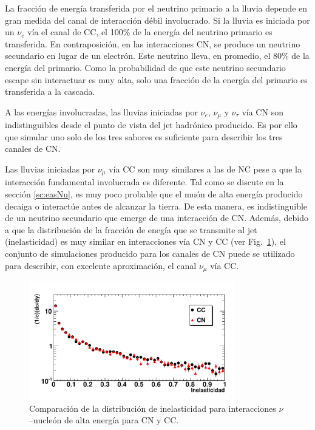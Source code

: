 	La fracción de energía transferida por el neutrino primario a la lluvia depende en gran medida del canal de interacción débil involucrado.
	Si la lluvia es iniciada por un $\nu_e$ vía el canal de CC, el 100\% de la energía del neutrino primario es transferida.
	En contraposición, en las interacciones CN, se produce un neutrino secundario en lugar de un electrón. Este neutrino lleva, en promedio, el 80\% de la energía del primario.
	Como la probabilidad de que este neutrino secundario escape sin interactuar es muy alta, solo una fracción de la energía del primario es transferida a la cascada. 

	A las energías involucradas, las lluvias iniciadas por $\nu_e$, $\nu_{\mu}$ y $\nu_{\tau}$ vía CN son indistinguibles desde el punto de vista del jet hadrónico producido.
	Es por ello que simular uno solo de los tres sabores es suficiente para describir los tres canales de CN.

	Las lluvias iniciadas por $\nu_{\mu}$ vía CC son muy similares a las de NC pese a que la interacción fundamental involucrada es diferente.
	Tal como se discute en la sección \ref{sc:easNu}, es muy poco probable que el muón de alta energía producido decaiga o interactúe antes de alcanzar la tierra.
	De esta manera, es indistinguible de un neutrino secundario que emerge de una interacción de CN. 
	Además, debido a que la distribución de la fracción de enegía que se transmite al jet (inelasticidad) es muy similar en interacciones vía CN y CC  (ver Fig.~\ref{fig:inelast}), el conjunto de simulaciones producido para los canales de CN puede se utilizado para describir, con excelente aproximación, el canal $\nu_{\mu}$ vía CC.
	\begin{figure}[ht]
	\begin{center}
	\includegraphics[width=0.80\textwidth]{fig/simulacionAuger/Inelasticity}
	\caption{Comparación de la distribución de inelasticidad para interacciones $\nu$--nucleón de alta energía para CN y CC.}
	\label{fig:inelast}
	\end{center}
	\end{figure}

